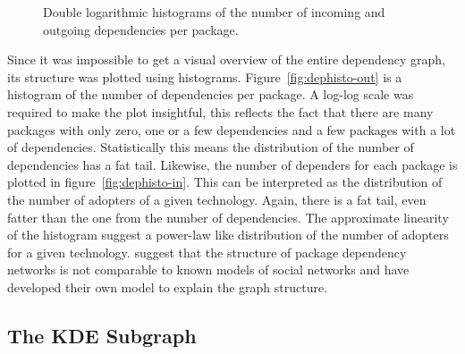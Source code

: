 \documentclass[smallextended,final]{svjour3}
\begin{document}
\begin{figure}
\small\centering
{}
\caption{Double logarithmic histograms of the number of incoming and outgoing dependencies per package.}
\end{figure}

Since it was impossible to get a visual overview of the entire dependency graph, its structure was plotted using histograms. Figure~\ref{fig:dephisto-out} is a histogram of the number of dependencies per package. A log-log scale was required to make the plot insightful, this reflects the fact that there are many packages with only zero, one or a few dependencies and a few packages with a lot of dependencies. Statistically this means the distribution of the number of dependencies has a fat tail. Likewise, the number of dependers for each package is plotted in figure~\ref{fig:dephisto-in}. This can be interpreted as the distribution of the number of adopters of a given technology. Again, there is a fat tail, even fatter than the one from the number of dependencies. The approximate linearity of the histogram suggest a power-law like distribution of the number of adopters for a given technology. \citet{zheng08} suggest that the structure of package dependency networks is not comparable to known models of social networks and have developed their own model to explain the graph structure.

\subsection{The KDE Subgraph}
\end{document}
